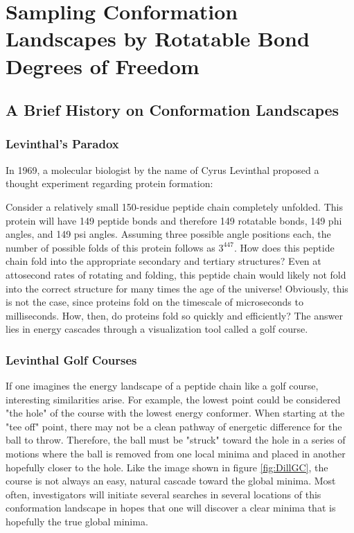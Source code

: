 \chapter{Sampling Conformation Landscapes by Rotatable Bond Degrees of Freedom}
\label{ch:ConformationLandscape}

\section{A Brief History on Conformation Landscapes}

\subsection{Levinthal's Paradox}

In 1969, a molecular biologist by the name of Cyrus Levinthal proposed a thought experiment regarding protein formation\cite{Levinthal}:

Consider a relatively small 150-residue peptide chain completely unfolded.
This protein will have 149 peptide bonds and therefore 149 rotatable bonds, 149 phi angles, and 149 psi angles. 
Assuming three possible angle positions each, the number of possible folds of this protein follows as $3^{447}$.
How does this peptide chain fold into the appropriate secondary and tertiary structures? 
Even at attosecond rates of rotating and folding, this peptide chain would likely not fold into the correct structure for many times the age of the universe!
Obviously, this is not the case, since proteins fold on the timescale of microseconds to milliseconds.\cite{LevParadoxCalculated}
How, then, do proteins fold so quickly and efficiently?
The answer lies in energy cascades through a visualization tool called a golf course.

\subsection{Levinthal Golf Courses}

If one imagines the energy landscape of a peptide chain like a golf course, interesting similarities arise.
For example, the lowest point could be considered "the hole" of the course with the lowest energy conformer. 
When starting at the "tee off" point, there may not be a clean pathway of energetic difference for the ball to throw.
Therefore, the ball must be "struck" toward the hole in a series of motions where the ball is removed from one local minima and placed in another hopefully closer to the hole. 
Like the image shown in figure \ref{fig:DillGC}, the course is not always an easy, natural cascade toward the global minima.
Most often, investigators will initiate several searches in several locations of this conformation landscape in hopes that one will discover a clear minima that is hopefully the true global minima.

